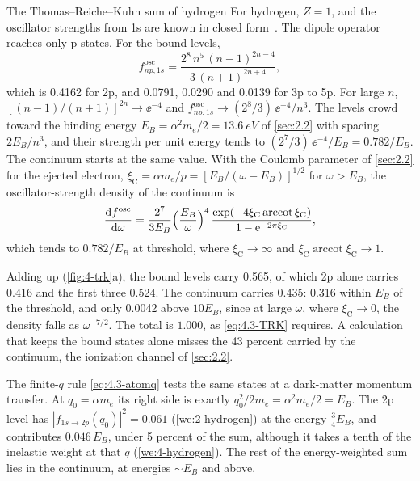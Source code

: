\begin{workedexample}{The Thomas--Reiche--Kuhn sum of hydrogen}\label{we:4-trk}
For hydrogen, $Z = 1$, and the oscillator strengths from 1s are known in closed form~\cite[Sect.~61]{bethe1957quantum}. The dipole operator reaches only p states. For the bound levels,
\begin{equation*}
  f^{\mathrm{osc}}_{np,1s} = \frac{2^8\,n^5\,(n - 1)^{2n-4}}{3\,(n + 1)^{2n+4}} ,
\end{equation*}
which is 0.4162 for 2p, and 0.0791, 0.0290 and 0.0139 for 3p to 5p. For large $n$, $[(n - 1)/(n + 1)]^{2n} \to \ee^{-4}$ and $f^{\mathrm{osc}}_{np,1s} \to (2^8/3)\,\ee^{-4}/n^3$. The levels crowd toward the binding energy $E_B = \alpha^2m_e/2 = \SI{13.6}{eV}$ of \cref{sec:2.2} with spacing $2E_B/n^3$, and their strength per unit energy tends to $(2^7/3)\,\ee^{-4}/E_B = 0.782/E_B$. The continuum starts at the same value. With the Coulomb parameter of \cref{sec:2.2} for the ejected electron, $\xi_{\mathrm{C}} = \alpha m_e/p = [E_B/(\omega - E_B)]^{1/2}$ for $\omega > E_B$, the oscillator-strength density of the continuum is~\cite[Sect.~61]{bethe1957quantum}
\begin{equation*}
  \frac{\mathrm{d} f^{\mathrm{osc}}}{\mathrm{d}\omega} = \frac{2^7}{3E_B}\Bigl(\frac{E_B}{\omega}\Bigr)^4\,\frac{\exp(-4\xi_{\mathrm{C}}\operatorname{arccot}\xi_{\mathrm{C}})}{1 - \mathrm{e}^{-2\pi\xi_{\mathrm{C}}}} ,
\end{equation*}
which tends to $0.782/E_B$ at threshold, where $\xi_{\mathrm{C}} \to \infty$ and $\xi_{\mathrm{C}}\operatorname{arccot}\xi_{\mathrm{C}} \to 1$.

Adding up (\cref{fig:4-trk}a), the bound levels carry 0.565, of which 2p alone carries 0.416 and the first three 0.524. The continuum carries 0.435: 0.316 within $E_B$ of the threshold, and only 0.0042 above $10E_B$, since at large $\omega$, where $\xi_{\mathrm{C}} \to 0$, the density falls as $\omega^{-7/2}$. The total is $1.000$, as \cref{eq:4.3-TRK} requires. A calculation that keeps the bound states alone misses the 43 percent carried by the continuum, the ionization channel of \cref{sec:2.2}.

The finite-$q$ rule \cref{eq:4.3-atomq} tests the same states at a dark-matter momentum transfer. At $q_0 = \alpha m_e$ its right side is exactly $q_0^2/2m_e = \alpha^2m_e/2 = E_B$. The 2p level has $|f_{1s\to2p}(q_0)|^2 = 0.061$ (\cref{we:2-hydrogen}) at the energy $\tfrac34E_B$, and contributes $0.046\,E_B$, under 5 percent of the sum, although it takes a tenth of the inelastic weight at that $q$ (\cref{we:4-hydrogen}). The rest of the energy-weighted sum lies in the continuum, at energies $\sim E_B$ and above.
\end{workedexample}

